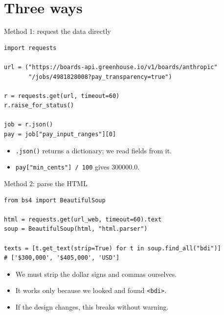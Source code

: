 \documentclass[11pt,aspectratio=169]{beamer}
\newenvironment{wideitemize}
  {\begin{itemize}\setlength{\itemsep}{10pt}}
  {\end{itemize}}
\begin{document}
\section{Three ways}
\begin{frame}[fragile]{Method 1: request the data directly}
\begin{lstlisting}[style=py]
import requests

url = ("https://boards-api.greenhouse.io/v1/boards/anthropic"
       "/jobs/4981828008?pay_transparency=true")

r = requests.get(url, timeout=60)
r.raise_for_status()

job = r.json()
pay = job["pay_input_ranges"][0]
\end{lstlisting}

\begin{wideitemize}
  \item \texttt{.json()} returns a dictionary; we read fields from it.
  \item \texttt{pay["min\_cents"] / 100} gives 300000.0.
\end{wideitemize}
\end{frame}

\begin{frame}[fragile]{Method 2: parse the HTML}
\begin{lstlisting}[style=py]
from bs4 import BeautifulSoup

html = requests.get(url_web, timeout=60).text
soup = BeautifulSoup(html, "html.parser")

texts = [t.get_text(strip=True) for t in soup.find_all("bdi")]
# ['$300,000', '$405,000', 'USD']
\end{lstlisting}

\begin{wideitemize}
  \item We must strip the dollar signs and commas ourselves.
  \item It works only because we looked and found \texttt{<bdi>}.
  \item If the design changes, this breaks without warning.
\end{wideitemize}
\end{frame}
\end{document}
